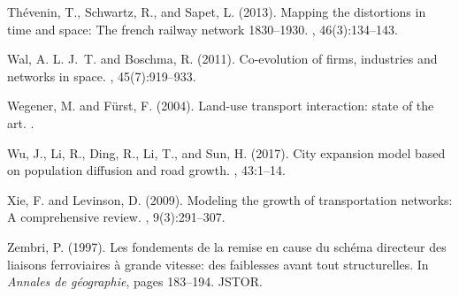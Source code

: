 \documentclass[11pt]{article}
\begin{document}
\begin{thebibliography}{}
Th{\'e}venin, T., Schwartz, R., and Sapet, L. (2013).
\newblock Mapping the distortions in time and space: The french railway network
  1830--1930.
, 46(3):134--143.

Wal, A. L. J.~T. and Boschma, R. (2011).
\newblock Co-evolution of firms, industries and networks in space.
, 45(7):919--933.

Wegener, M. and F{\"u}rst, F. (2004).
\newblock Land-use transport interaction: state of the art.
.

Wu, J., Li, R., Ding, R., Li, T., and Sun, H. (2017).
\newblock City expansion model based on population diffusion and road growth.
, 43:1--14.

Xie, F. and Levinson, D. (2009).
\newblock Modeling the growth of transportation networks: A comprehensive
  review.
, 9(3):291--307.

Zembri, P. (1997).
\newblock Les fondements de la remise en cause du sch{\'e}ma directeur des
  liaisons ferroviaires {\`a} grande vitesse: des faiblesses avant tout
  structurelles.
\newblock In {\em Annales de g{\'e}ographie}, pages 183--194. JSTOR.

\end{thebibliography}
\end{document}
